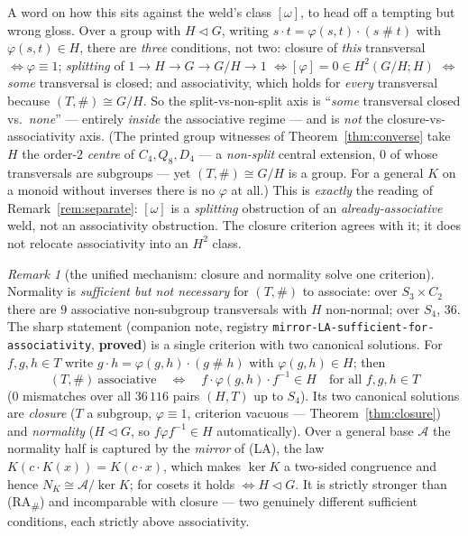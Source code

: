 \documentclass[11pt]{amsart}
\theoremstyle{plain}
\theoremstyle{definition}
\theoremstyle{remark}
\newtheorem{remark}[theorem]{Remark}
\newcommand{\sh}{\mathbin{\#}}
\newcommand{\LA}{\textsf{(LA)}}
\newcommand{\RA}{\textsf{(RA}\textsubscript{\#}\textsf{)}}
\begin{document}
A word on how this sits against the weld's class $[\omega]$, to head off a tempting but wrong gloss.
Over a group with $H\triangleleft G$, writing $s\cdot t=\varphi(s,t)\cdot(s\sh t)$ with
$\varphi(s,t)\in H$, there are \emph{three} conditions, not two: closure of \emph{this} transversal
$\iff\varphi\equiv1$; \emph{splitting} of $1\to H\to G\to G/H\to1$ $\iff[\varphi]=0\in H^2(G/H;H)$
$\iff$ \emph{some} transversal is closed; and associativity, which holds for \emph{every}
transversal because $(T,\sh)\cong G/H$. So the split-vs-non-split axis is ``\emph{some} transversal
closed vs.\ \emph{none}'' --- entirely \emph{inside} the associative regime --- and is \emph{not}
the closure-vs-associativity axis. (The printed group witnesses of Theorem~\ref{thm:converse} take
$H$ the order-$2$ \emph{centre} of $C_4, Q_8, D_4$ --- a \emph{non-split} central extension, $0$ of
whose transversals are subgroups --- yet $(T,\sh)\cong G/H$ is a group. For a general $K$ on a
monoid without inverses there is no $\varphi$ at all.) This is \emph{exactly} the reading of
Remark~\ref{rem:separate}: $[\omega]$ is a \emph{splitting} obstruction of an
\emph{already-associative} weld, not an associativity obstruction. The closure criterion agrees with
it; it does not relocate associativity into an $H^2$ class.

\begin{remark}[the unified mechanism: closure and normality solve one criterion]
\label{rem:mirror}
Normality is \emph{sufficient but not necessary} for $(T,\sh)$ to associate: over $S_3\times C_2$
there are $9$ associative non-subgroup transversals with $H$ non-normal; over $S_4$, $36$. The sharp
statement (companion note, registry \texttt{mirror-LA-sufficient-for-associativity},
\textbf{proved}) is a single criterion with two canonical solutions. For $f,g,h\in T$ write
$g\cdot h=\varphi(g,h)\cdot(g\sh h)$ with $\varphi(g,h)\in H$; then
\[
  (T,\sh)\ \text{associative}\quad\Longleftrightarrow\quad f\cdot\varphi(g,h)\cdot f^{-1}\in H
  \quad\text{for all } f,g,h\in T
\]
($0$ mismatches over all $36\,116$ pairs $(H,T)$ up to $S_4$). Its two canonical solutions are
\emph{closure} ($T$ a subgroup, $\varphi\equiv1$, criterion vacuous --- Theorem~\ref{thm:closure})
and \emph{normality} ($H\triangleleft G$, so $f\varphi f^{-1}\in H$ automatically). Over a general
base $\mathcal{A}$ the normality half is captured by the \emph{mirror} of \LA{}, the law
$K(c\cdot K(x))=K(c\cdot x)$, which makes $\ker K$ a two-sided congruence and hence $N_K\cong
\mathcal{A}/\!\ker K$; for cosets it holds $\iff H\triangleleft G$. It is strictly stronger than
\RA{} and incomparable with closure --- two genuinely different sufficient conditions, each strictly
above associativity.
\end{remark}
\end{document}
